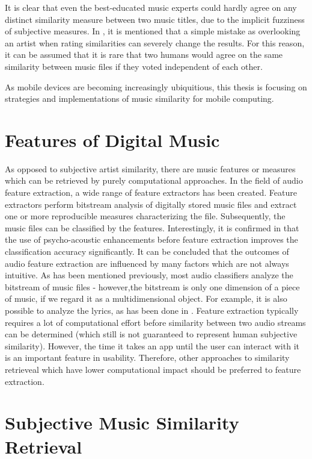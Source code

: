 It is clear that even the best-educated music experts could hardly agree on 
any distinct similarity measure between two music titles, due to the implicit fuzziness of subjective measures. In \cite{Ellis02thequest}, it is mentioned that a simple mistake as overlooking an artist when rating similarities can severely change the results. For this reason, it can be assumed that it is rare that two humans would agree on the same similarity between music files
if they voted independent of each other.

As mobile devices are becoming increasingly ubiquitious, this thesis is focusing on strategies and implementations of music similarity for mobile computing.

\section{Features of Digital Music}

As opposed to subjective artist similarity, there are music features or measures which can be retrieved by purely computational approaches. In the field of audio feature extraction, a wide range of feature extractors has been created. Feature extractors perform bitstream analysis of digitally stored music files and extract one or more reproducible measures characterizing the file. Subsequently, the music files can be classified by the features. Interestingly, it is confirmed in \cite{LID-05ismir} that the use of psycho-acoustic enhancements before feature extraction improves the classification accuracy significantly. It can be concluded that the outcomes of audio feature extraction are influenced by many factors which are not always intuitive.
As has been mentioned previously, most audio classifiers analyze the bitstream of music files - however,the bitstream is only one dimension of a piece of music, if we regard it as a multidimensional object. For example, it is also possible to analyze the lyrics, as has been done in \cite{DBLP:conf/ismir/MayerNR08}. Feature extraction typically requires a lot of computational effort before similarity between two audio streams can be determined (which still is not guaranteed to represent human subjective similarity). However, the time it takes an app until the user can interact with it is an important feature in usability. Therefore, other approaches to similarity retrieveal which have lower computational impact should be preferred to feature extraction.

\section{Subjective Music Similarity Retrieval}


